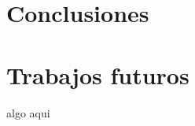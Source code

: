 \documentclass[twoside,spanish,ESP,MSc]{plantillaLabUPV}
\theoremstyle{definition}
\begin{document}
\chapter{Conclusiones}


\chapter{Trabajos futuros}
algo aqui

	



\appendix
%


\end{document}
